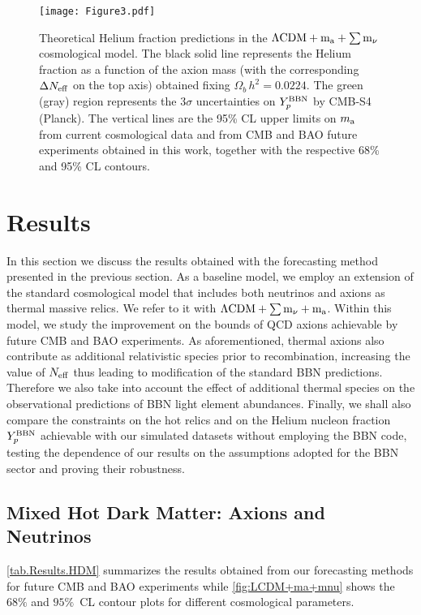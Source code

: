 \documentclass[fleqn,usenatbib,letters]{mnras}
\begin{document}
\begin{figure*}
    \centering
    \texttt{[image: Figure3.pdf]}
\caption{Theoretical Helium fraction predictions in the $\Lambda\rm{CDM} + m_{\rm a} +\sum m_{\nu}$ cosmological model. The black solid line represents the Helium fraction as a function of the axion mass (with the corresponding $\Delta N_{\rm eff}$ on the top axis) obtained fixing $\Omega_b\,h^2=0.0224$. The green (gray) region represents the $3\sigma$ uncertainties on $Y_p^{\rm BBN}$ by CMB-S4 (Planck). The vertical lines are the 95\% CL upper limits on $m_{\rm a}$ from current cosmological data \citep{Giare:2020vzo} and from CMB and BAO future experiments obtained in this work, together with the respective 68\% and 95\% CL contours.}
\label{fig:Yp_DNeff_ma}
\end{figure*}

\section{Results}\label{Sec.Results}

In this section we discuss the results obtained with the forecasting method presented in the previous section. As a baseline model, we employ an extension of the standard cosmological model that includes both neutrinos and axions as thermal massive relics. 
We refer to it with $\Lambda\rm{CDM} + \sum m_{\nu} + m_a$. Within this model, we study the improvement on the bounds of QCD axions achievable by future CMB and BAO experiments. As aforementioned, thermal axions also contribute as additional relativistic species prior to recombination, increasing the value of $N_{\rm eff}$ thus leading to modification of the standard BBN predictions. Therefore we also take into account the effect of additional thermal species on the observational predictions of BBN light element abundances. Finally, we shall also compare the constraints on the hot relics and on the Helium nucleon fraction $Y_p^{\rm BBN}$ achievable with our simulated datasets without employing the BBN code, testing the dependence of our results on the assumptions adopted for the BBN sector and proving their robustness.


\subsection{Mixed Hot Dark Matter: Axions and Neutrinos}

\autoref{tab.Results.HDM} summarizes the results obtained from our forecasting methods for future CMB and BAO experiments while \autoref{fig:LCDM+ma+mnu} shows the $68\%$ and $95\%$~CL contour plots for different cosmological parameters. 
\end{document}
